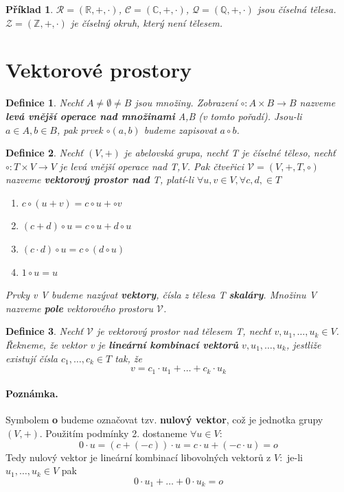 \documentclass[12pt,a4paper]{article}
\newtheorem{definition}{Definice}
\newtheorem{example}{Příklad}
\begin{document}
\begin{example}
	 $ \mathscr{R} = (\mathbb{R}, + , \cdot)$,  $\mathscr{C} = (\mathbb{C}, + , \cdot)$, $ \mathscr{Q} = (\mathbb{Q}, + , \cdot)$ jsou číselná tělesa. $\mathscr{Z} = (\mathbb{Z}, + , \cdot)$ je číselný okruh, který není tělesem.
\end{example}

\section{Vektorové prostory}
\begin{definition}
	Nechť $A \not= \emptyset \not= B$ jsou množiny. Zobrazení $\circ : A \times B \rightarrow B$ nazveme \textbf{levá vnější operace nad množinami} A,B (v tomto pořadí). Jsou-li $a \in A, b \in B$, pak prvek $\circ(a,b)$ budeme zapisovat $a \circ b$.
\end{definition}

\begin{definition}
	Nechť $(V, +)$ je abelovská grupa, nechť T je číselné těleso, nechť $\circ : T \times V \rightarrow V$ je levá vnější operace nad T,V. Pak čtveřici $\mathscr{V} = (V, +, T, \circ)$ nazveme \textbf{vektorový prostor nad} T, platí-li $\forall u,v \in V, \forall c,d, \in T$
	\begin{enumerate}
		\item $c \circ (u + v) = c \circ u + \circ v$
		\item $(c + d) \circ u = c \circ u + d \circ u$
		\item $(c \cdot d) \circ u = c \circ (d \circ u)$
		\item $1 \circ u = u$
	\end{enumerate}
	Prvky v V budeme nazývat \textbf{vektory}, čísla z tělesa T \textbf{skaláry}. Množinu V nazveme \textbf{pole} vektorového prostoru $\mathscr{V}$.
\end{definition}

\begin{definition}
	Nechť  $\mathscr{V}$ je vektorový prostor nad tělesem T, nechť $v,u_1,\dots,u_k \in V$. Řekneme, že vektor v je \textbf{lineární kombinací vektorů}  $v,u_1,\dots,u_k$, jestliže existují čísla $c_1, \dots, c_k \in T$ tak, že $$v = c_1 \cdot u_1 + \dots + c_k \cdot u_k$$
\end{definition}
\paragraph{Poznámka.} Symbolem \textbf{o} budeme označovat tzv. \textbf{nulový vektor}, což je jednotka grupy $(V, +)$. Použitím podmínky 2. dostaneme $\forall u \in V:$ $$0 \cdot u = (c + (-c)) \cdot u = c \cdot u + (-c \cdot u) = o$$
Tedy nulový vektor je lineární kombinací libovolných vektorů z $V: $ je-li $u_1,\dots,u_k \in V$ pak $$0 \cdot u_1 + \dots + 0 \cdot u_k = o$$
\end{document}
